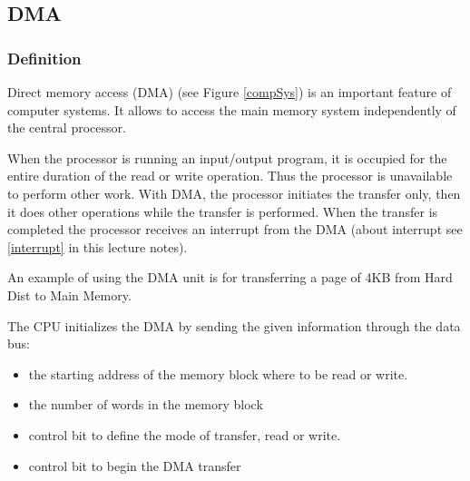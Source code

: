 \subsection{DMA}

\subsubsection{Definition}

Direct memory access (DMA) (see Figure \ref{compSys}) is an important feature of computer systems. It allows  to access the main memory  system independently of the central processor.

When the processor is running an input/output program, it is occupied for the entire duration of the read or write operation. Thus the processor is unavailable to perform other work. With DMA, the processor  initiates the transfer only, then it does other operations while the transfer is performed. When the transfer is completed the processor receives an interrupt from the DMA (about interrupt see \ref{interrupt} in this lecture notes).

An example of using the DMA unit is for transferring a page of 4KB from Hard Dist to Main Memory.

The CPU initializes the DMA by sending the given information through the data bus:
\begin{itemize}
    \item the starting address of the memory block where to be read or write.
    \item the number of words in the memory block
    \item control bit to define the mode of transfer, read or write.
    \item control bit to begin the DMA transfer
\end{itemize}

